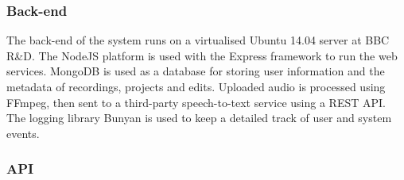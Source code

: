 \subsubsection{Back-end}
The back-end of the system runs on a virtualised Ubuntu 14.04 server at BBC
R\&D. The NodeJS platform is used with the Express framework to run the web
services. MongoDB is used as a database for storing user information and the
metadata of recordings, projects and edits. Uploaded audio is processed using
FFmpeg, then sent to a third-party speech-to-text service using a REST API. The
logging library Bunyan is used to keep a detailed track of user and system
events.

\subsubsection{API}\label{sec:api}

